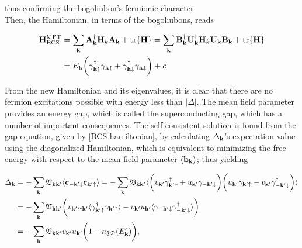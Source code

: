 thus confirming the bogoliubon's fermionic character. \\

Then, the Hamiltonian, in terms of the bogoliubons, reads

\begin{equation}
\begin{split}
    {\bf H}_{\textnormal{BCS}}^{\textnormal{MFT}} &= \sum_{{\bf k}} {\bf A}_{{\bf k}}^\dagger {\bf H}_k {\bf A}_{{\bf k}} + \tr {\bf H} = \sum_{{\bf k}} {\bf B}_{{\bf k}}^\dagger {\bf U}_{{\bf k}}^\dagger {\bf H}_k {\bf U}_{{\bf k}} {\bf B}_{{\bf k}} + \tr {\bf H} \\
    &= E_{{\bf k}} \bigg(\gamma_{{\bf k} \uparrow}^\dagger \gamma_{{\bf k} \uparrow} + \gamma_{{\bf k} \downarrow}^\dagger \gamma_{{\bf k} \downarrow}\bigg) + c
\end{split}
\end{equation}

From the new Hamiltonian and its eigenvalues, it is clear that there are no fermion excitations possible with energy less than $|\Delta|$. The mean field parameter provides an energy gap, which is called the superconducting gap, which has a number of important consequences. The self-consistent solution is found from the gap equation, given by \cref{BCS hamiltonian}, by calculating $\Delta_{{\bf k}}$'s expectation value using the diagonalized Hamiltonian, which is equivalent to minimizing the free energy with respect to the mean field parameter $\langle {\bf b}_{{\bf k}} \rangle$; thus yielding

\begin{equation}
    \begin{split}
        \Delta_{{\bf k}} &= - \sum_{{\bf k}} \mathfrak{V}_{{\bf k}{\bf k}'} \langle {\bf c}_{-{\bf k}' \downarrow} {\bf c}_{{\bf k}' \uparrow} \rangle = - \sum_{{\bf k}} \mathfrak{V}_{{\bf k}{\bf k}'} \langle \bigg( v_{{\bf k}'} \gamma_{{\bf k}'\uparrow}^\dagger + u_{{\bf k}'} \gamma_{-{\bf k}'\downarrow}
        \bigg) \bigg(u_{{\bf k}'} \gamma_{{\bf k}'\uparrow} - v_{{\bf k}'} \gamma_{-{\bf k}'\downarrow}^\dagger
        \bigg) \rangle \\
        &= - \sum_{{\bf k}} \mathfrak{V}_{{\bf k}{\bf k}'} \bigg( v_{{\bf k}'} u_{{\bf k}'} \langle \gamma_{{\bf k}'\uparrow}^\dagger \gamma_{{\bf k}'\uparrow}\rangle - v_{{\bf k}'} u_{{\bf k}'} \langle \gamma_{-{\bf k}'\downarrow} \gamma_{-{\bf k}'\downarrow}^\dagger \rangle \bigg) \\
        &= - \sum_{{\bf k}} \mathfrak{V}_{{\bf k}{\bf k}'} v_{{\bf k}'} u_{{\bf k}'} \bigg(1 - n_{\mathfrak{F}\mathfrak{D}}(E_{\bf k}') \bigg),
    \end{split}
\end{equation}

